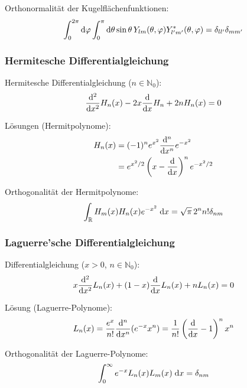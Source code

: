 			\noindent
			Orthonormalität der Kugelflächenfunktionen:
			\begin{equation}
				\int_0^{2\pi}\mathrm{d}\varphi \int_0^{\pi}\mathrm{d}\theta \sin\theta\, Y_{lm}(\theta,\varphi) Y^{*}_{l'm'}(\theta,\varphi) = 	\delta_{ll'}\delta_{mm'}
			\end{equation}

		\subsubsection{Hermitesche Differentialgleichung}
			\noindent
			Hermitesche Differentialgleichung ($n\in\mathbb{N}_0$):
			\begin{equation}
				\frac{\mathrm{d}^2}{\mathrm{d} x^2} H_n(x) -2x\frac{\mathrm{d} }{\mathrm{d} x} H_n+2 n H_n(x)=0
			\end{equation}

			\noindent
			Lösungen (Hermitpolynome):
			\begin{equation} \label{eq:Hermitpolynome}
				\begin{aligned}
					H_n(x) &= (-1)^n e^{x^2} \frac{\mathrm{d}^n}{\mathrm{d} x^n}e^{-x^2} \\
					&= e^{x^2/2}\left(x-\frac{\mathrm{d} }{\mathrm{d} x}\right)^n e^{-x^2/2} \\
				\end{aligned}
			\end{equation}

			\noindent
			Orthogonalität der Hermitpolynome:
			\begin{equation}
				\int_{\mathbb{R}} H_m(x) H_n(x) e^{-x^2}\;\mathrm{d} x = \sqrt{\pi}\,2^n n!\delta_{nm}
			\end{equation}

		\subsubsection{Laguerre'sche Differentialgleichung}
			\noindent
			Differentialgleichung ($x>0$, $n\in\mathbb{N}_0$):
			\begin{equation}
				x\frac{\mathrm{d}^2}{\mathrm{d} x^2}L_n(x) +(1-x)\frac{\mathrm{d} }{\mathrm{d} x}L_n(x) + nL_n(x) = 0
			\end{equation}

			\noindent
			Lösung (Laguerre-Polynome):
			\begin{equation}
				L_n(x) = \frac{e^x}{n!}\frac{\mathrm{d}^n}{\mathrm{d} x^n}(e^{-x} x^n) = \frac{1}{n!} \left(\frac{\mathrm{d} }{\mathrm{d} x}-1\right)^n x^n
			\end{equation}

			\noindent
			Orthogonalität der Laguerre-Polynome:
			\begin{equation}
				\int_0^\infty e^{-x} L_n(x) L_m(x)\;\mathrm{d} x = \delta_{nm}
			\end{equation}

